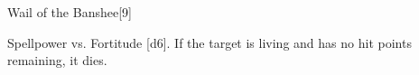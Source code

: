 \begin{spellsection}{Wail of the Banshee}[9]
    \begin{spellheader}
    \end{spellheader}
    \begin{spellcontent}
        \begin{spelltargetinginfo}
        \end{spelltargetinginfo}
        \begin{spelleffects}
            \begin{spellattack}{Spellpower vs. Fortitude}
                \spellsuccess {}[d6]. If the target is living and has no hit points remaining, it dies.
            \end{spellattack}
        \end{spelleffects}
    \end{spellcontent}
    \begin{spellfooter}
        \miscastexplode
    \end{spellfooter}
\end{spellsection}

